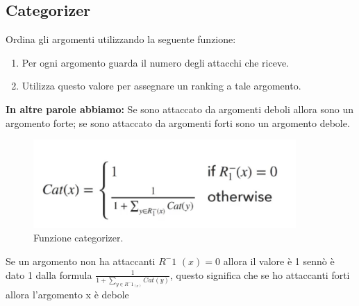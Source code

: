     \subsection{Categorizer}
    Ordina gli argomenti utilizzando la seguente funzione:
    \begin{enumerate}
        \item Per ogni argomento guarda il numero degli attacchi che riceve.
        \item Utilizza questo valore per assegnare un ranking a tale argomento.
    \end{enumerate}
    \textbf{In altre parole abbiamo:} Se sono attaccato da argomenti deboli
    allora sono un argomento forte; se sono attaccato da argomenti forti sono un
    argomento debole.
    \begin{figure}[htp]
        \centering
        \includegraphics[width=10cm, keepaspectratio]{img/Cap8/quantitativo1.png}
        \caption{Funzione categorizer.}
    \end{figure}
    Se un argomento non ha attaccanti $R^-1$ $(x) = 0$ allora il valore è 1
    sennò è dato 1 dalla formula $\frac{1}{1+\sum_{y\in R^-1_(x)} Cat(y)}$, questo
    significa che se ho attaccanti forti allora l'argomento x è debole


